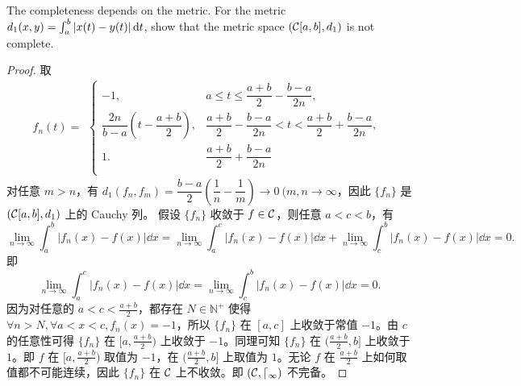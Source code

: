 \documentclass[lang=cn,a4paper,newtx,bibend=bibtex]{elegantpaper}
\begin{document}
\begin{prob}[D.16]
  The completeness depends on the metric.
  For the metric 
  $d_1(x,y)=\int_a^b|x(t)-y(t)|\,\mathrm{d} t$,
  show that the metric space $({\cal C}[a,b],d_1)$
  is not complete.
\end{prob}

\begin{proof}
    取
    \begin{equation*}
        f_n(t) = 
        \begin{aligned}
            \left\{
                \begin{array}{ll}
                    -1, & a\leq t\leq \dfrac{a+b}2 - \dfrac{b-a}{2n}, \\
                    \dfrac{2n}{b-a}\left(t - \dfrac{a+b}2\right), & \dfrac{a+b}2 - \dfrac{b-a}{2n} < t < \dfrac{a+b}2 + \dfrac{b-a}{2n}, \\
                    1. & \dfrac{a+b}2 + \dfrac{b-a}{2n} \\
                \end{array}
            \right.
        \end{aligned}
    \end{equation*}
    对任意 $m>n$，有 $d_1(f_n, f_m) = \dfrac{b-a}2(\dfrac 1n - \dfrac 1m) \rightarrow 0 ~(m,n\rightarrow \infty$，因此 $\{f_n\}$ 是 $({\cal C}[a,b],d_1)$ 上的 Cauchy 列。
    假设 $\{f_n\}$ 收敛于 $f\in \cal C$，则任意 $a<c<b$，有
    \begin{equation*}
        \lim_{n\rightarrow \infty} \int_a^b |f_n(x) - f(x)| \dd x
        = \lim_{n\rightarrow \infty} \int_a^c |f_n(x) - f(x)| \dd x
        + \lim_{n\rightarrow \infty} \int_c^b |f_n(x) - f(x)| \dd x
        = 0.
    \end{equation*}
    即
    \begin{equation*}
        \lim_{n\rightarrow \infty} \int_a^c |f_n(x) - f(x)| \dd x
        = \lim_{n\rightarrow \infty} \int_c^b |f_n(x) - f(x)| \dd x
        = 0.
    \end{equation*}
    因为对任意的 $a<c<\frac {a+b}2$，都存在 $N\in \mathbb{N}^+$ 使得 $\forall n>N, \forall a<x<c, f_n(x) = -1$，所以 $\{f_n\}$ 在 $[a,c]$ 上收敛于常值 $-1$。由 $c$ 的任意性可得 $\{f_n\}$ 在 $[a,\frac{a+b}2)$ 上收敛于 $-1$。同理可知 $\{f_n\}$ 在 $(\frac {a+b}2,b]$ 上收敛于 $1$。即 $f$ 在 $[a,\frac{a+b}2)$ 取值为 $-1$，在 $(\frac {a+b}2,b]$ 上取值为 $1$。无论 $f$ 在 $\frac {a+b}2$ 上如何取值都不可能连续，因此 $\{f_n\}$ 在 $\cal C$ 上不收敛。即 $(\cal C, d_1)$ 不完备。
\end{proof}
\end{document}
